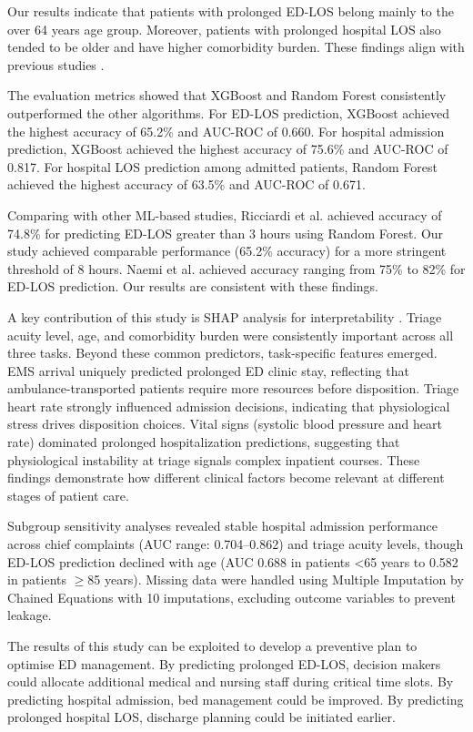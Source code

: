 \documentclass[harvard,article]{frontiersinFPHY_FAMS}
\begin{document}
Our results indicate that patients with prolonged ED-LOS belong mainly to the over 64 years age group. Moreover, patients with prolonged hospital LOS also tended to be older and have higher comorbidity burden. These findings align with previous studies \cite{ricciardi2024, wu2025, raita2019}.

The evaluation metrics showed that XGBoost and Random Forest consistently outperformed the other algorithms. For ED-LOS prediction, XGBoost achieved the highest accuracy of 65.2\% and AUC-ROC of 0.660. For hospital admission prediction, XGBoost achieved the highest accuracy of 75.6\% and AUC-ROC of 0.817. For hospital LOS prediction among admitted patients, Random Forest achieved the highest accuracy of 63.5\% and AUC-ROC of 0.671.

Comparing with other ML-based studies, Ricciardi et al. \cite{ricciardi2024} achieved accuracy of 74.8\% for predicting ED-LOS greater than 3 hours using Random Forest. Our study achieved comparable performance (65.2\% accuracy) for a more stringent threshold of 8 hours. Naemi et al. \cite{naemi2021} achieved accuracy ranging from 75\% to 82\% for ED-LOS prediction. Our results are consistent with these findings.

A key contribution of this study is SHAP analysis for interpretability \cite{slack2022, wang2025}. Triage acuity level, age, and comorbidity burden were consistently important across all three tasks. Beyond these common predictors, task-specific features emerged. EMS arrival uniquely predicted prolonged ED clinic stay, reflecting that ambulance-transported patients require more resources before disposition. Triage heart rate strongly influenced admission decisions, indicating that physiological stress drives disposition choices. Vital signs (systolic blood pressure and heart rate) dominated prolonged hospitalization predictions, suggesting that physiological instability at triage signals complex inpatient courses. These findings demonstrate how different clinical factors become relevant at different stages of patient care.

Subgroup sensitivity analyses revealed stable hospital admission performance across chief complaints (AUC range: 0.704--0.862) and triage acuity levels, though ED-LOS prediction declined with age (AUC 0.688 in patients <65 years to 0.582 in patients $\geq$85 years). Missing data were handled using Multiple Imputation by Chained Equations with 10 imputations, excluding outcome variables to prevent leakage.

The results of this study can be exploited to develop a preventive plan to optimise ED management. By predicting prolonged ED-LOS, decision makers could allocate additional medical and nursing staff during critical time slots. By predicting hospital admission, bed management could be improved. By predicting prolonged hospital LOS, discharge planning could be initiated earlier.
\end{document}
